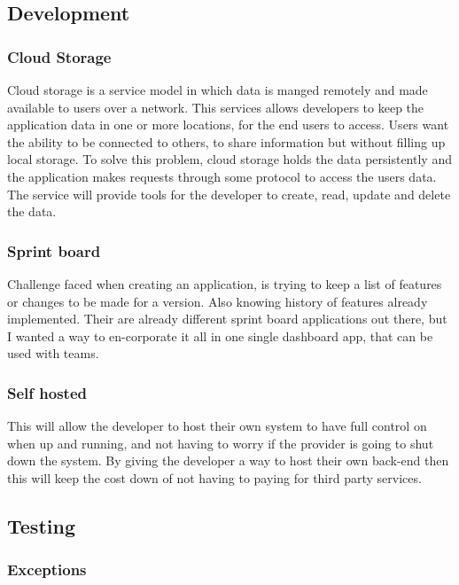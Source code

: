\subsection{Development}

\subsubsection{Cloud Storage}

Cloud storage is a service model in which data is manged remotely and made available to users over a network. This services allows developers to keep the application data in one or more locations, for the end users to access. Users want the ability to be connected to others, to share information but without filling up local storage. To solve this problem, cloud storage holds the data persistently and the application makes requests through some protocol to access the users data. The service will provide tools for the developer to create, read, update and delete the data.

\subsubsection{Sprint board}
Challenge faced when creating an application, is trying to keep a list of features or changes to be made for a version. Also knowing history of features already implemented. Their are already different sprint board applications out there, but I wanted a way to en-corporate it all in one single dashboard app, that can be used with teams.

\subsubsection{Self hosted}
This will allow the developer to host their own system to have full control on when up and running, and not having to worry if the provider is going to shut down the system. By giving the developer a way to host their own back-end then this will keep the cost down of not having to paying for third party services.

\subsection{Testing}

\subsubsection{Exceptions}

